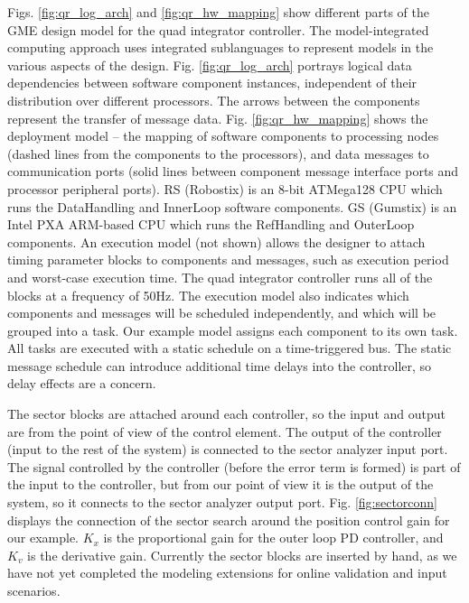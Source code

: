 Figs. \ref{fig:qr_log_arch} and \ref{fig:qr_hw_mapping} show different parts of
the GME design model for the quad integrator controller.  The model-integrated
computing approach uses integrated sublanguages to represent models in the
various aspects of the design\cite{mic:overview}. Fig. \ref{fig:qr_log_arch} portrays 
logical data dependencies between software component instances, independent of their 
distribution over different processors. The arrows between the components represent
the transfer of message data. Fig. \ref{fig:qr_hw_mapping} shows the deployment 
model -- the mapping of software components to processing nodes (dashed lines from 
the components to the processors), and data messages to communication ports (solid lines 
between component message interface ports and processor peripheral ports).  RS
(Robostix) is an 8-bit ATMega128 CPU which runs the DataHandling and InnerLoop software
components. GS (Gumstix) is an Intel PXA ARM-based CPU which runs the RefHandling and
OuterLoop components. An execution model (not shown) allows the designer to attach timing 
parameter blocks to components and messages, such as execution period and worst-case execution 
time.  The quad integrator controller runs all of the blocks at a frequency of 50Hz.  
The execution model also indicates which components and messages will be scheduled 
independently, and which will be grouped into a task.  Our example model assigns 
each component to its own task.  All tasks are executed with a static schedule on a 
time-triggered bus.  The static message schedule can introduce additional time delays into
the controller, so delay effects are a concern.

The sector blocks are attached around each controller, so the input and output are from 
the point of view of the control element.  The output of the controller (input to the
rest of the system) is connected to the sector analyzer input port.  The signal controlled by
the controller (before the error term is formed) is part of the input to the controller,
but from our point of view it is the output of the system, so it connects to the sector
analyzer output port.  Fig. \ref{fig:sectorconn} displays the connection of the sector search
around the position control gain for our example. $K_x$ is the proportional gain for the
outer loop PD controller, and $K_v$ is the derivative gain.  Currently the sector blocks are
inserted by hand, as we have not yet completed the modeling extensions for online validation
and input scenarios.

